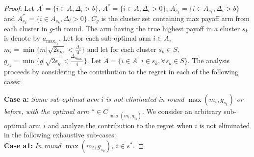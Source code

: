 \begin{proof}
Let $A^{'}=\lbrace i \in A,\Delta_{i}> b\rbrace$,  $A^{''}=\lbrace i \in A, \Delta_{i} > 0\rbrace$, $A^{'}_{s_{k}}=\lbrace i \in A_{s_{k}},\Delta_{i}> b\rbrace$ and $A^{''}_{s_{k}}=\lbrace i \in A_{s_{k}}, \Delta_{i} > 0 \rbrace$. $C_{g}$ is the cluster set containing max payoff arm from each cluster in $g$-th round. The arm having the true highest payoff in a cluster $s_{k}$ is denote by $a_{\max_{s_{k}}}$. Let for each sub-optimal arm ${i}\in A$, $m_{i}=\min{\lbrace m|\sqrt{2\epsilon_{m}} < \frac{\Delta_{i}}{4} \rbrace}$ and let for each cluster $s_{k}\in S$, $g_{s_{k}}=\min{\lbrace g|\sqrt{2\epsilon_{g}} < \frac{\Delta_{a_{\max_{s_{k}}}}}{4} \rbrace}$. Let $\check{A}=\lbrace {i}\in A^{'} | {i}\in s_{k} , \forall s_{k}\in S \rbrace$. The analysis proceeds by considering the contribution to the regret in each of the following cases:

\textbf{Case a:} \textit{Some sub-optimal arm ${i}$ is not eliminated in round $\max(m_{i},g_{s_{k}})$ or before, with the optimal arm ${*}\in C_{\max(m_{i},g_{s_{k}})}$.}
We consider an arbitrary sub-optimal arm ${i}$ and analyze the contribution to the regret when $i$ is not eliminated in the following exhaustive sub-cases:\\
\textbf{Case a1:} \textit{In round $\max(m_{i},g_{s_{k}})$, ${i} \in s^{*}$.}


\end{proof}

